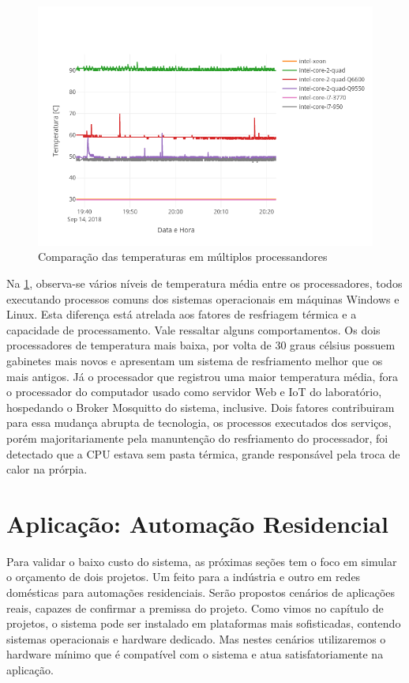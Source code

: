 \begin{figure}[h!]
\centering
\includegraphics[width=16cm]{./02_Capitulos/02_Cap4/figures/temp-devices-5}
\caption{Comparação das temperaturas em múltiplos processandores}
\label{fig:temp-devices-5}
\end{figure}

Na \ref{fig:temp-devices-5}, observa-se vários níveis de temperatura média entre os processadores, todos executando processos comuns dos sistemas operacionais em máquinas Windows e Linux. Esta diferença está atrelada aos fatores de resfriagem térmica e a capacidade de processamento. Vale ressaltar alguns comportamentos. Os dois processadores de temperatura mais baixa, por volta de 30 graus célsius possuem gabinetes mais novos e apresentam um sistema de resfriamento melhor que os mais antigos. Já o processador que registrou uma maior temperatura média, fora o processador do computador usado como servidor Web e IoT do laboratório, hospedando o Broker Mosquitto do sistema, inclusive. Dois fatores contribuiram para essa mudança abrupta de tecnologia, os processos executados dos serviços, porém majoritariamente pela manuntenção do resfriamento do processador, foi detectado que a CPU estava sem pasta térmica, grande responsável pela troca de calor na prórpia.


\section{Aplicação: Automação Residencial}
\label{section:residencial}

Para validar o baixo custo do sistema, as próximas seções tem o foco em simular o orçamento de dois projetos. Um feito para a indústria e outro em redes domésticas para automações residenciais. Serão propostos cenários de aplicações reais, capazes de confirmar a premissa do projeto.
Como vimos no capítulo de projetos, o sistema pode ser instalado em plataformas mais sofisticadas, contendo sistemas operacionais e hardware dedicado. Mas nestes cenários utilizaremos o hardware mínimo que é compatível com o sistema e atua satisfatoriamente na aplicação.


